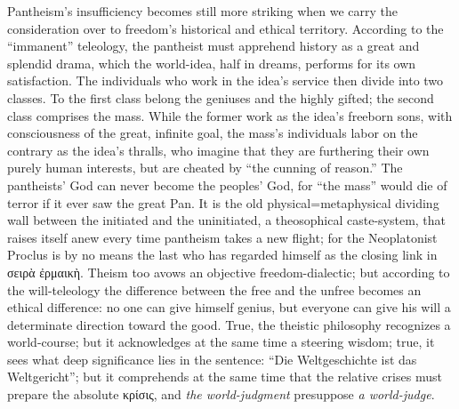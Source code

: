 \documentclass[12pt]{book}
\begin{document}
Pantheism's insufficiency becomes still more striking when we carry the
consideration over to freedom's historical and ethical territory. According
to the ``immanent'' teleology, the pantheist must apprehend history as a
great and splendid drama, which the world-idea, half in dreams, performs for
its own satisfaction. The individuals who work in the idea's service then
divide into two classes. To the first class belong the geniuses and the
highly gifted; the second class comprises the mass. While the former work as
the idea's freeborn sons, with consciousness of the great, infinite goal,
the mass's individuals labor on the contrary as the idea's thralls, who
imagine that they are furthering their own purely human interests, but are
cheated by ``the cunning of reason.'' The pantheists' God can never become
the peoples' God, for ``the mass'' would die of terror if it ever saw the
great Pan. It is the old physical=metaphysical dividing wall between the
initiated and the uninitiated, a theosophical caste-system, that raises
itself anew every time pantheism takes a new flight; for the Neoplatonist
Proclus is by no means the last who has regarded himself as the closing link
in σειρὰ ἐρμαικὴ. Theism too avows an objective freedom-dialectic; but
according to the will-teleology the difference between the free and the
unfree becomes an ethical difference: no one can give himself genius, but
everyone can give his will a determinate direction toward the good. True,
the theistic philosophy recognizes a world-course; but it acknowledges at
the same time a steering wisdom; true, it sees what deep significance lies
in the sentence: ``Die Weltgeschichte ist das Weltgericht''; but it
comprehends at the same time that the relative crises must prepare the
absolute κρίσις, and \emph{the world-judgment} presuppose \emph{a
world-judge}.
\end{document}
